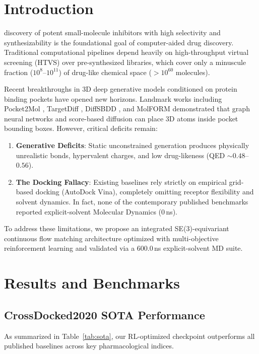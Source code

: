 \documentclass[10pt,journal,compsoc]{IEEEtran}
\begin{document}
\maketitle
\IEEEdisplaynontitleabstractindextext
\IEEEpeerreviewmaketitle

\section{Introduction}
 discovery of potent small-molecule inhibitors with high selectivity and synthesizability is the foundational goal of computer-aided drug discovery. Traditional computational pipelines depend heavily on high-throughput virtual screening (HTVS) over pre-synthesized libraries, which cover only a minuscule fraction ($10^8$--$10^{11}$) of drug-like chemical space ($>10^{60}$ molecules).

Recent breakthroughs in 3D deep generative models conditioned on protein binding pockets have opened new horizons. Landmark works including Pocket2Mol \cite{peng2022pocket2mol}, TargetDiff \cite{guan2023targetdiff}, DiffSBDD \cite{schneuing2024diffsbdd}, and MolFORM \cite{wang2024molform} demonstrated that graph neural networks and score-based diffusion can place 3D atoms inside pocket bounding boxes. However, critical deficits remain:
\begin{enumerate}
    \item \textbf{Generative Deficits}: Static unconstrained generation produces physically unrealistic bonds, hypervalent charges, and low drug-likeness (QED $\sim 0.48$--$0.56$).
    \item \textbf{The Docking Fallacy}: Existing baselines rely strictly on empirical grid-based docking (AutoDock Vina), completely omitting receptor flexibility and solvent dynamics. In fact, none of the contemporary published benchmarks reported explicit-solvent Molecular Dynamics (0\,ns).
\end{enumerate}

To address these limitations, we propose an integrated SE(3)-equivariant continuous flow matching architecture optimized with multi-objective reinforcement learning and validated via a 600.0\,ns explicit-solvent MD suite.

\section{Results and Benchmarks}

\subsection{CrossDocked2020 SOTA Performance}
As summarized in Table~\ref{tab:sota}, our RL-optimized checkpoint outperforms all published baselines across key pharmacological indices.
\end{document}
